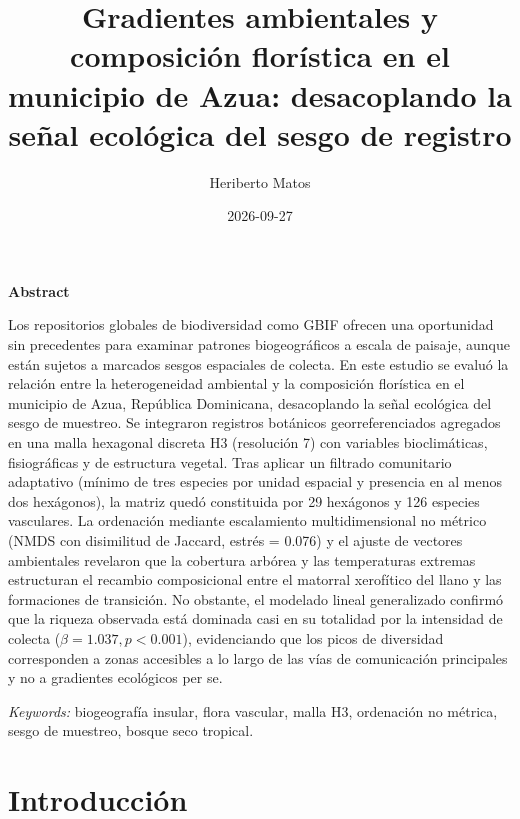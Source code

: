 \documentclass[
  12pt,
  man,
  floatsintext]{apa7}
\affiliation{Universidad Autónoma de Santo Domingo (UASD)}
\title{Gradientes ambientales y composición florística en el municipio de Azua: desacoplando la señal ecológica del sesgo de registro}
\author{Heriberto Matos}
\date{2026-09-27}
\begin{document}
\maketitle

\newpage

\begin{center}
\textbf{\large Abstract}
\end{center}

Los repositorios globales de biodiversidad como GBIF ofrecen una oportunidad sin precedentes para examinar patrones biogeográficos a escala de paisaje, aunque están sujetos a marcados sesgos espaciales de colecta. En este estudio se evaluó la relación entre la heterogeneidad ambiental y la composición florística en el municipio de Azua, República Dominicana, desacoplando la señal ecológica del sesgo de muestreo. Se integraron registros botánicos georreferenciados agregados en una malla hexagonal discreta H3 (resolución 7) con variables bioclimáticas, fisiográficas y de estructura vegetal. Tras aplicar un filtrado comunitario adaptativo (mínimo de tres especies por unidad espacial y presencia en al menos dos hexágonos), la matriz quedó constituida por 29 hexágonos y 126 especies vasculares. La ordenación mediante escalamiento multidimensional no métrico (NMDS con disimilitud de Jaccard, estrés = 0.076) y el ajuste de vectores ambientales revelaron que la cobertura arbórea y las temperaturas extremas estructuran el recambio composicional entre el matorral xerofítico del llano y las formaciones de transición. No obstante, el modelado lineal generalizado confirmó que la riqueza observada está dominada casi en su totalidad por la intensidad de colecta (\(\beta = 1.037, p < 0.001\)), evidenciando que los picos de diversidad corresponden a zonas accesibles a lo largo de las vías de comunicación principales y no a gradientes ecológicos per se.

\vspace{1em}

\noindent \textit{Keywords:} biogeografía insular, flora vascular, malla H3, ordenación no métrica, sesgo de muestreo, bosque seco tropical.

\newpage

\tableofcontents

\newpage

\section{Introducción}\label{introducciuxf3n}
\end{document}
